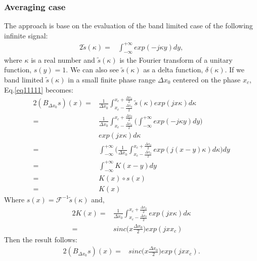 \subsubsection{Averaging case}
The approach is base on the  evaluation of the band limited case of the following infinite signal:
\begin{alignat}{2}
\tilde{s}(\kappa) =& \int_{-\infty}^{+\infty}exp(-j\kappa y)dy, \label{eq1111122}
\end{alignat}
where $\kappa$ is a real number and $\tilde{s}(\kappa)$ is the Fourier transform of a unitary function, $s(y)=1$. We can also see 
$\tilde{s}(\kappa)$ as a delta function, $\delta (\kappa)$.
If we band limited $\tilde{s}(\kappa)$ in a small finite phase range  $\Delta x_0$ centered on the phase $x_c$, Eq.\ref{eq11111} becomes:
\begin{alignat*}{2}
(B_{\Delta x_0}s)(x) =& \frac{1}{\Delta x_0}\int_{x_c-\frac{\Delta x_0}{2}}^{x_c+\frac{\Delta 
x_0}{2}}\tilde{s}(\kappa)exp(jx\kappa)d\kappa\label{eq1111111}\\
		     =& \frac{1}{\Delta x_0}\int_{x_c-\frac{\Delta x_0}{2}}^{x_c+\frac{\Delta x_0}{2}}\bigg( 
\int_{-\infty}^{+\infty}exp(-j\kappa y)dy\bigg)\\ 
		      & exp(jx\kappa)d\kappa\\
		     =&\int_{-\infty}^{+\infty}\bigg( \frac{1}{\Delta x_0} \int_{x_c-\frac{\Delta x_0}{2}}^{x_c+\frac{\Delta 
x_0}{2}}exp(j(x-y)\kappa)d\kappa\bigg)dy\\
		     =&\int_{-\infty}^{+\infty}K(x-y)dy\\
		     =& K(x)\circ s(x)\\
		     =&K(x)
\end{alignat*}
Where $s(x)=\mathcal{F}^{-1}\tilde{s}(\kappa)$ and,
\begin{alignat*}{2}
 K(x)=& \frac{1}{\Delta x_0} \int_{x_c-\frac{\Delta x_0}{2}}^{x_c+\frac{\Delta x_0}{2}}exp(jx\kappa )d\kappa\\
     =& sinc \big(x\frac{\Delta x_0}{2}\big) exp(jxx_c)
\end{alignat*}
Then the result follows:
\begin{alignat}{2}
(B_{\Delta x_0}s)(x) = & sinc \big(x\frac{\Delta x_0}{2}\big) exp(jxx_c). %
\end{alignat}
